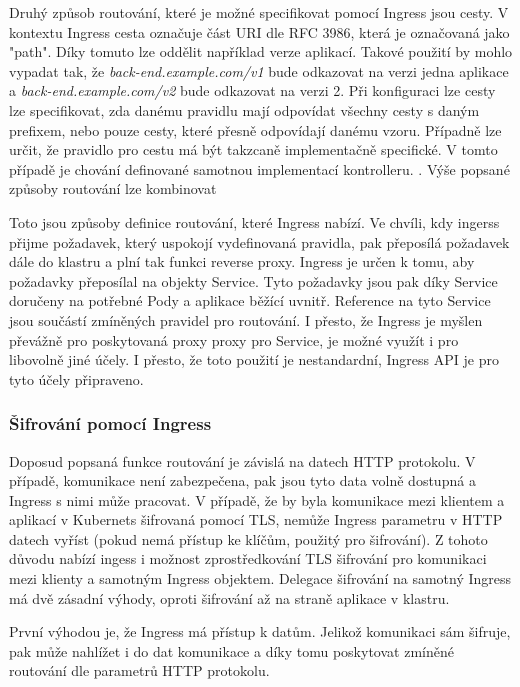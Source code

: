 Druhý způsob routování, které je možné specifikovat pomocí Ingress jsou cesty. V kontextu Ingress cesta označuje část URI dle RFC 3986, která je označovaná jako "path". Díky tomuto lze oddělit například verze aplikací. Takové použití by mohlo vypadat tak, že \textit{back-end.example.com/v1} bude odkazovat na verzi jedna aplikace a \textit{back-end.example.com/v2} bude odkazovat na verzi 2. Při konfiguraci lze cesty lze specifikovat, zda danému pravidlu mají odpovídat všechny cesty s daným prefixem, nebo pouze cesty, které přesně odpovídají danému vzoru. Případně lze určit, že pravidlo pro cestu má být takzcaně implementačně specifické. V tomto případě je chování definované samotnou implementací kontrolleru. \cite{thekubernetesauthors_2022_ingress}. Výše popsané způsoby routování lze kombinovat

Toto jsou způsoby definice routování, které Ingress nabízí. Ve chvíli, kdy ingerss přijme požadavek, který uspokojí vydefinovaná pravidla, pak přeposílá požadavek dále do klastru a plní tak funkci reverse proxy. Ingress je určen k tomu, aby požadavky přeposílal na objekty Service. Tyto požadavky jsou pak díky Service doručeny na potřebné Pody a aplikace běžící uvnitř. Reference na tyto Service jsou součástí zmíněných pravidel pro routování. I přesto, že Ingress je myšlen převážně pro poskytovaná proxy proxy pro Service, je možné využít i pro libovolně jiné účely. I přesto, že toto použití je nestandardní, Ingress API je pro tyto účely připraveno.\

\subsubsection{Šifrování pomocí Ingress}
Doposud popsaná funkce routování je závislá na datech HTTP protokolu. V případě, komunikace není zabezpečena, pak jsou tyto data volně dostupná a Ingress s nimi může pracovat. V případě, že by byla komunikace mezi klientem a aplikací v Kubernets šifrovaná pomocí TLS, nemůže Ingress parametru v HTTP datech vyříst (pokud nemá přístup ke klíčům, použitý pro šifrování). Z tohoto důvodu nabízí ingess i možnost zprostředkování TLS šifrování pro komunikaci mezi klienty a samotným Ingress objektem. Delegace šifrování na samotný Ingress má dvě zásadní výhody, oproti šifrování až na straně aplikace v klastru.\cite{poulton_2022_the}

První výhodou je, že Ingress má přístup k datům. Jelikož komunikaci sám šifruje, pak může nahlížet i do dat komunikace a díky tomu poskytovat zmíněné routování dle parametrů HTTP protokolu.


